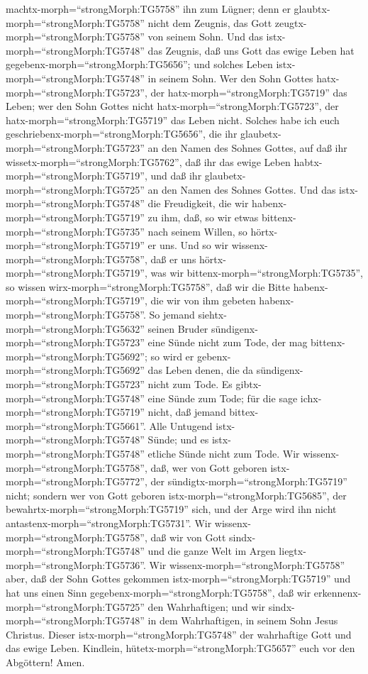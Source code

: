 machtx-morph=``strongMorph:TG5758'' ihn zum Lügner; denn er
glaubtx-morph=``strongMorph:TG5758'' nicht dem Zeugnis, das Gott
zeugtx-morph=``strongMorph:TG5758'' von seinem Sohn.  Und
das istx-morph=``strongMorph:TG5748'' das Zeugnis, daß uns Gott das
ewige Leben hat gegebenx-morph=``strongMorph:TG5656''; und solches Leben
istx-morph=``strongMorph:TG5748'' in seinem Sohn.  Wer den
Sohn Gottes hatx-morph=``strongMorph:TG5723'', der
hatx-morph=``strongMorph:TG5719'' das Leben; wer den Sohn Gottes nicht
hatx-morph=``strongMorph:TG5723'', der hatx-morph=``strongMorph:TG5719''
das Leben nicht.  Solches habe ich euch
geschriebenx-morph=``strongMorph:TG5656'', die ihr
glaubetx-morph=``strongMorph:TG5723'' an den Namen des Sohnes Gottes,
auf daß ihr wissetx-morph=``strongMorph:TG5762'', daß ihr das ewige
Leben habtx-morph=``strongMorph:TG5719'', und daß ihr
glaubetx-morph=``strongMorph:TG5725'' an den Namen des Sohnes Gottes.
 Und das istx-morph=``strongMorph:TG5748'' die Freudigkeit,
die wir habenx-morph=``strongMorph:TG5719'' zu ihm, daß, so wir etwas
bittenx-morph=``strongMorph:TG5735'' nach seinem Willen, so
hörtx-morph=``strongMorph:TG5719'' er uns.  Und so wir
wissenx-morph=``strongMorph:TG5758'', daß er uns
hörtx-morph=``strongMorph:TG5719'', was wir
bittenx-morph=``strongMorph:TG5735'', so wissen
wirx-morph=``strongMorph:TG5758'', daß wir die Bitte
habenx-morph=``strongMorph:TG5719'', die wir von ihm gebeten
habenx-morph=``strongMorph:TG5758''.  So jemand
siehtx-morph=``strongMorph:TG5632'' seinen Bruder
sündigenx-morph=``strongMorph:TG5723'' eine Sünde nicht zum Tode, der
mag bittenx-morph=``strongMorph:TG5692''; so wird er
gebenx-morph=``strongMorph:TG5692'' das Leben denen, die da
sündigenx-morph=``strongMorph:TG5723'' nicht zum Tode. Es
gibtx-morph=``strongMorph:TG5748'' eine Sünde zum Tode; für die sage
ichx-morph=``strongMorph:TG5719'' nicht, daß jemand
bittex-morph=``strongMorph:TG5661''.  Alle Untugend
istx-morph=``strongMorph:TG5748'' Sünde; und es
istx-morph=``strongMorph:TG5748'' etliche Sünde nicht zum Tode.
 Wir wissenx-morph=``strongMorph:TG5758'', daß, wer von
Gott geboren istx-morph=``strongMorph:TG5772'', der
sündigtx-morph=``strongMorph:TG5719'' nicht; sondern wer von Gott
geboren istx-morph=``strongMorph:TG5685'', der
bewahrtx-morph=``strongMorph:TG5719'' sich, und der Arge wird ihn nicht
antastenx-morph=``strongMorph:TG5731''.  Wir
wissenx-morph=``strongMorph:TG5758'', daß wir von Gott
sindx-morph=``strongMorph:TG5748'' und die ganze Welt im Argen
liegtx-morph=``strongMorph:TG5736''.  Wir
wissenx-morph=``strongMorph:TG5758'' aber, daß der Sohn Gottes gekommen
istx-morph=``strongMorph:TG5719'' und hat uns einen Sinn
gegebenx-morph=``strongMorph:TG5758'', daß wir
erkennenx-morph=``strongMorph:TG5725'' den Wahrhaftigen; und wir
sindx-morph=``strongMorph:TG5748'' in dem Wahrhaftigen, in seinem Sohn
Jesus Christus. Dieser istx-morph=``strongMorph:TG5748'' der wahrhaftige
Gott und das ewige Leben.  Kindlein,
hütetx-morph=``strongMorph:TG5657'' euch vor den Abgöttern! Amen.
